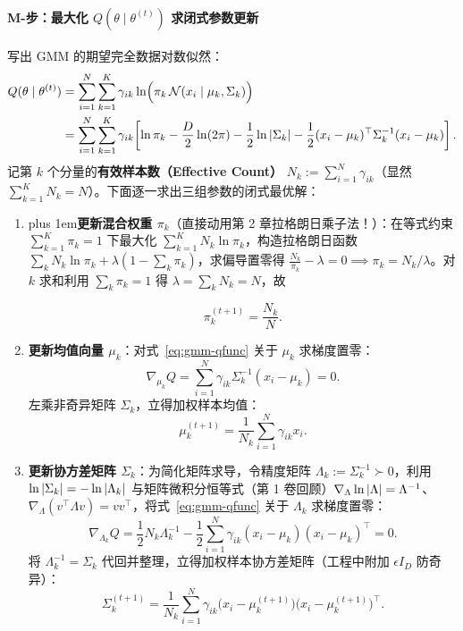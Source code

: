 \paragraph{M-步：最大化 $Q(\theta \mid \theta^{(t)})$ 求闭式参数更新}
写出 GMM 的期望完全数据对数似然：
\begin{align}
  Q(\theta \mid \theta^{(t)})
  &= \sum_{i=1}^{N}\sum_{k=1}^{K} \gamma_{ik}\ln\!\Big(\pi_k\,\mathcal{N}(x_i \mid \mu_k, \Sigma_k)\Big) \nonumber\\
  &= \sum_{i=1}^{N}\sum_{k=1}^{K} \gamma_{ik}\!\left[\ln \pi_k - \frac{D}{2}\ln(2\pi) - \frac{1}{2}\ln\left|\Sigma_k\right| - \frac{1}{2}(x_i - \mu_k)^\top \Sigma_k^{-1}(x_i - \mu_k)\right]. \label{eq:gmm-qfunc}
\end{align}
记第 $k$ 个分量的\textbf{有效样本数（Effective Count）} $N_k := \sum_{i=1}^{N} \gamma_{ik}$（显然 $\sum_{k=1}^K N_k = N$）。下面逐一求出三组参数的闭式最优解：

\begin{enumerate}
  \item {\rightskip=0pt plus 1em\relax \textbf{更新混合权重 $\pi_k$}（直接动用第 2 章拉格朗日乘子法！）：在等式约束 $\sum_{k=1}^K \pi_k = 1$ 下最大化 $\sum_{k=1}^K N_k \ln \pi_k$，构造拉格朗日函数 $\sum_k N_k \ln \pi_k + \lambda(1 - \sum_k \pi_k)$，求偏导置零得 $\frac{N_k}{\pi_k} - \lambda = 0 \implies \pi_k = N_k / \lambda$。对 $k$ 求和利用 $\sum_k \pi_k = 1$ 得 $\lambda = \sum_k N_k = N$，故\par}
  \begin{equation}\label{eq:gmm-m-pi}
    \pi_k^{(t+1)} = \frac{N_k}{N}.
  \end{equation}

  \item \textbf{更新均值向量 $\mu_k$}：对式~\eqref{eq:gmm-qfunc} 关于 $\mu_k$ 求梯度置零：
  \[
    \nabla_{\mu_k} Q = \sum_{i=1}^{N} \gamma_{ik} \Sigma_k^{-1}(x_i - \mu_k) = 0.
  \]
  左乘非奇异矩阵 $\Sigma_k$，立得加权样本均值：
  \begin{equation}\label{eq:gmm-m-mu}
    \mu_k^{(t+1)} = \frac{1}{N_k} \sum_{i=1}^{N} \gamma_{ik} x_i.
  \end{equation}

  \item \textbf{更新协方差矩阵 $\Sigma_k$}：为简化矩阵求导，令精度矩阵 $\Lambda_k := \Sigma_k^{-1} \succ 0$，利用 $\ln\left|\Sigma_k\right| = -\ln\left|\Lambda_k\right|$ 与矩阵微积分恒等式（第 1 卷回顾）$\nabla_{\Lambda} \ln\left|\Lambda\right| = \Lambda^{-1}$、$\nabla_{\Lambda}(v^\top \Lambda v) = v v^\top$，将式~\eqref{eq:gmm-qfunc} 关于 $\Lambda_k$ 求梯度置零：
  \[
    \nabla_{\Lambda_k} Q = \frac{1}{2} N_k \Lambda_k^{-1} - \frac{1}{2}\sum_{i=1}^{N} \gamma_{ik}(x_i - \mu_k)(x_i - \mu_k)^\top = 0.
  \]
  将 $\Lambda_k^{-1} = \Sigma_k$ 代回并整理，立得加权样本协方差矩阵（工程中附加 $\epsilon I_D$ 防奇异）：
  \begin{equation}\label{eq:gmm-m-sigma}
    \Sigma_k^{(t+1)} = \frac{1}{N_k}\sum_{i=1}^{N} \gamma_{ik}\big(x_i - \mu_k^{(t+1)}\big)\big(x_i - \mu_k^{(t+1)}\big)^\top.
  \end{equation}
\end{enumerate}


